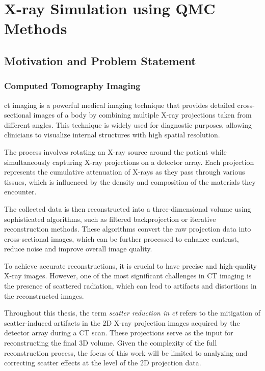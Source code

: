 \part{X-ray Simulation using QMC Methods}

\chapter{Motivation and Problem Statement} %
\label{Chapter6}

\section{Computed Tomography Imaging}

\ac{ct} imaging is a powerful medical imaging technique that provides detailed
cross-sectional images of a body by combining multiple X-ray projections taken
from different angles. This technique is widely used for diagnostic purposes,
allowing clinicians to visualize internal structures with high spatial
resolution.

The process involves rotating an X-ray source around the patient while
simultaneously capturing X-ray projections on a detector array. Each projection
represents the cumulative attenuation of X-rays as they pass through various
tissues, which is influenced by the density and composition of the materials
they encounter. 

The collected data is then reconstructed into a three-dimensional volume
using sophisticated algorithms, such as filtered backprojection or iterative
reconstruction methods. These algorithms convert the raw projection data into
cross-sectional images, which can be further processed to enhance contrast,
reduce noise and improve overall image quality.

To achieve accurate reconstructions, it is crucial to have precise and high-quality X-ray images. However, one of the most significant challenges in CT imaging is
the presence of scattered radiation, which can lead to artifacts and distortions
in the reconstructed images.

Throughout this thesis, the term \textit{scatter reduction in \ac{ct}} refers to the mitigation of scatter-induced artifacts in the 2D X-ray projection images acquired by the detector array during a CT scan. These projections serve as the input for reconstructing the final 3D volume. Given the complexity of the full reconstruction process, the focus of this work will be limited to analyzing and correcting scatter effects at the level of the 2D projection data. 


